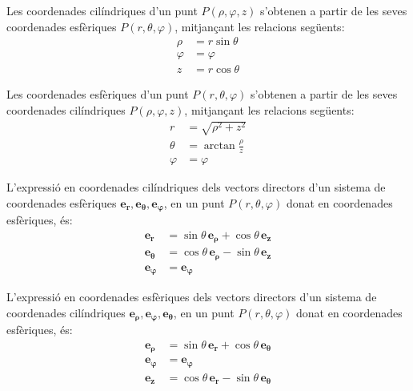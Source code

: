 \documentclass[catalan,a4paper,twoside,11pt]{article}
\begin{document}
Les coordenades cilíndriques  d'un punt $P(\rho,\varphi,z)$
s'obtenen a partir de les seves coordenades esfèriques
$P(r,\theta,\varphi)$, mitjançant les relacions següents:
\begin{subequations}\begin{align}
    \rho &=r\sin\theta \\ \varphi &=\varphi \\z &=r\cos\theta
\end{align}\end{subequations}

Les coordenades  esfèriques  d'un punt $P(r,\theta,\varphi)$
s'obtenen a partir de les seves coordenades cilíndriques
$P(\rho,\varphi,z)$, mitjançant les relacions següents:
\begin{subequations}\begin{align}
    r &=\sqrt{\rho^2+z^2}\\
    \theta &=\arctan\frac{\rho}{z}\\
    \varphi &=\varphi
\end{align}\end{subequations}

L'expressió en coordenades cilíndriques dels vectors directors d'un sistema de coordenades  esfèriques $\boldsymbol{e_r},\boldsymbol{e_\theta},\boldsymbol{e_\varphi}$, en un punt $P(r,\theta,\varphi)$ donat en coordenades esfèriques, és:
\begin{subequations}\begin{align}
    \boldsymbol{e_r} &=\sin\theta\,\boldsymbol{e_\rho}+\cos\theta\,\boldsymbol{e_z}\\
    \boldsymbol{e_\theta}
    &=\cos\theta\,\boldsymbol{e_\rho}-\sin\theta\,\boldsymbol{e_z}\\
    \boldsymbol{e_\varphi}&=\boldsymbol{e_\varphi}
\end{align}\end{subequations}

L'expressió en coordenades esfèriques dels vectors directors d'un sistema de coordenades  cilíndriques $\boldsymbol{e_\rho},\boldsymbol{e_\varphi},\boldsymbol{e_\theta}$, en un punt $P(r,\theta,\varphi)$ donat en coordenades esfèriques, és:
\begin{subequations}\begin{align}
    \boldsymbol{e_\rho} &=\sin\theta\,\boldsymbol{e_r}+
    \cos\theta\,\boldsymbol{e_\theta}\\
    \boldsymbol{e_\varphi}&=\boldsymbol{e_\varphi}\\
    \boldsymbol{e_z} &=\cos\theta\,\boldsymbol{e_r}-
    \sin\theta\,\boldsymbol{e_\theta}
\end{align}\end{subequations}
\end{document}
